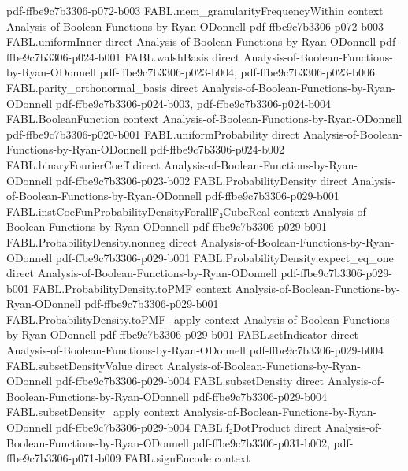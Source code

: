 \begin{theorem}
  {pdf-ffbe9c7b3306-p072-b003}
\proofstep
  {FABL.mem_granularityFrequencyWithin}
  {context}
  {Analysis-of-Boolean-Functions-by-Ryan-ODonnell}
  {pdf-ffbe9c7b3306-p072-b003}
\proofstep
  {FABL.uniformInner}
  {direct}
  {Analysis-of-Boolean-Functions-by-Ryan-ODonnell}
  {pdf-ffbe9c7b3306-p024-b001}
\proofstep
  {FABL.walshBasis}
  {direct}
  {Analysis-of-Boolean-Functions-by-Ryan-ODonnell}
  {pdf-ffbe9c7b3306-p023-b004,
    pdf-ffbe9c7b3306-p023-b006}
\proofstep
  {FABL.parity_orthonormal_basis}
  {direct}
  {Analysis-of-Boolean-Functions-by-Ryan-ODonnell}
  {pdf-ffbe9c7b3306-p024-b003,
    pdf-ffbe9c7b3306-p024-b004}
\proofstep
  {FABL.BooleanFunction}
  {context}
  {Analysis-of-Boolean-Functions-by-Ryan-ODonnell}
  {pdf-ffbe9c7b3306-p020-b001}
\proofstep
  {FABL.uniformProbability}
  {direct}
  {Analysis-of-Boolean-Functions-by-Ryan-ODonnell}
  {pdf-ffbe9c7b3306-p024-b002}
\proofstep
  {FABL.binaryFourierCoeff}
  {direct}
  {Analysis-of-Boolean-Functions-by-Ryan-ODonnell}
  {pdf-ffbe9c7b3306-p023-b002}
\proofstep
  {FABL.ProbabilityDensity}
  {direct}
  {Analysis-of-Boolean-Functions-by-Ryan-ODonnell}
  {pdf-ffbe9c7b3306-p029-b001}
\proofstep
  {FABL.instCoeFunProbabilityDensityForallF₂CubeReal}
  {context}
  {Analysis-of-Boolean-Functions-by-Ryan-ODonnell}
  {pdf-ffbe9c7b3306-p029-b001}
\proofstep
  {FABL.ProbabilityDensity.nonneg}
  {direct}
  {Analysis-of-Boolean-Functions-by-Ryan-ODonnell}
  {pdf-ffbe9c7b3306-p029-b001}
\proofstep
  {FABL.ProbabilityDensity.expect_eq_one}
  {direct}
  {Analysis-of-Boolean-Functions-by-Ryan-ODonnell}
  {pdf-ffbe9c7b3306-p029-b001}
\proofstep
  {FABL.ProbabilityDensity.toPMF}
  {context}
  {Analysis-of-Boolean-Functions-by-Ryan-ODonnell}
  {pdf-ffbe9c7b3306-p029-b001}
\proofstep
  {FABL.ProbabilityDensity.toPMF_apply}
  {context}
  {Analysis-of-Boolean-Functions-by-Ryan-ODonnell}
  {pdf-ffbe9c7b3306-p029-b001}
\proofstep
  {FABL.setIndicator}
  {direct}
  {Analysis-of-Boolean-Functions-by-Ryan-ODonnell}
  {pdf-ffbe9c7b3306-p029-b004}
\proofstep
  {FABL.subsetDensityValue}
  {direct}
  {Analysis-of-Boolean-Functions-by-Ryan-ODonnell}
  {pdf-ffbe9c7b3306-p029-b004}
\proofstep
  {FABL.subsetDensity}
  {direct}
  {Analysis-of-Boolean-Functions-by-Ryan-ODonnell}
  {pdf-ffbe9c7b3306-p029-b004}
\proofstep
  {FABL.subsetDensity_apply}
  {context}
  {Analysis-of-Boolean-Functions-by-Ryan-ODonnell}
  {pdf-ffbe9c7b3306-p029-b004}
\proofstep
  {FABL.f₂DotProduct}
  {direct}
  {Analysis-of-Boolean-Functions-by-Ryan-ODonnell}
  {pdf-ffbe9c7b3306-p031-b002,
    pdf-ffbe9c7b3306-p071-b009}
\proofstep
  {FABL.signEncode}
  {context}

\end{theorem}
